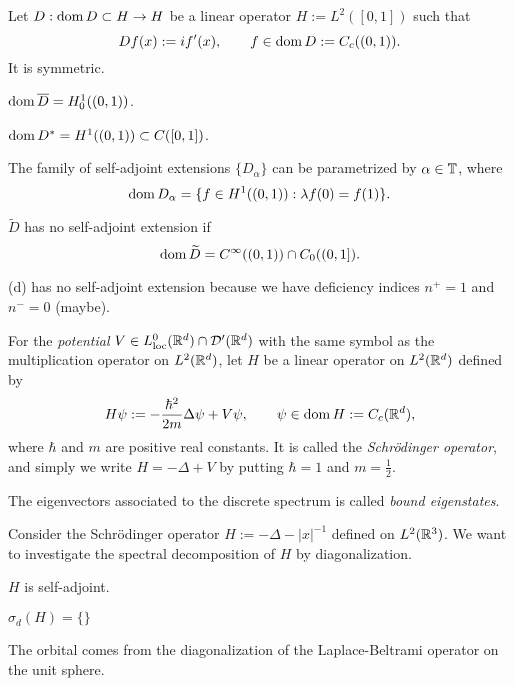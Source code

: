 \documentclass{../../large}
\begin{document}
\begin{prb}
Let $D:\operatorname{dom} D\subset H\to H$ be a linear operator $H:=L^2([0,1])$ such that
\[Df(x):=if'(x),\qquad f\in\operatorname{dom} D:=C_c((0,1)).\]
It is symmetric.

\begin{parts}
\item $\operatorname{dom}\overline D=H_0^1((0,1))$.
\item $\operatorname{dom} D^*=H^1((0,1))\subset C([0,1])$.
\item The family of self-adjoint extensions $\{D_\alpha\}$ can be parametrized by $\alpha\in\mathbb{T}$, where
\[\operatorname{dom} D_\alpha=\{f\in H^1((0,1)):\lambda f(0)=f(1)\}.\]
\item $\tilde D$ has no self-adjoint extension if
\[\operatorname{dom}\widetilde D=C^\infty((0,1))\cap C_0((0,1]).\]
\end{parts}
\end{prb}
\begin{pf}
(d)
has no self-adjoint extension because we have deficiency indices $n^+=1$ and $n^-=0$ (maybe).
\end{pf}

\begin{prb}
For the \emph{potential} $V\in L^0_{\mathrm{loc}}(\mathbb{R}^d)\cap\mathcal{D}'(\mathbb{R}^d)$ with the same symbol as the multiplication operator on $L^2(\mathbb{R}^d)$, let $H$ be a linear operator on $L^2(\mathbb{R}^d)$ defined by
\[H\psi:=-\frac{\hbar^2}{2m}\Delta\psi+V\psi,\qquad\psi\in\operatorname{dom} H:=C_c(\mathbb{R}^d),\]
where $\hbar$ and $m$ are positive real constants.
It is called the \emph{Schr\"odinger operator}, and simply we write $H=-\Delta+V$ by putting $\hbar=1$ and $m=\frac12$.

The eigenvectors associated to the discrete spectrum is called \emph{bound eigenstates}.


\end{prb}


\begin{prb}
Consider the Schr\"odinger operator $H:=-\Delta-|x|^{-1}$ defined on $L^2(\mathbb{R}^3)$.
We want to investigate the spectral decomposition of $H$ by diagonalization.
\begin{parts}
\item $H$ is self-adjoint.
\item $\sigma_d(H)=\{\}$
\end{parts}
\end{prb}
\begin{pf}
The orbital comes from the diagonalization of the Laplace-Beltrami operator on the unit sphere.
\end{pf}
\end{document}
